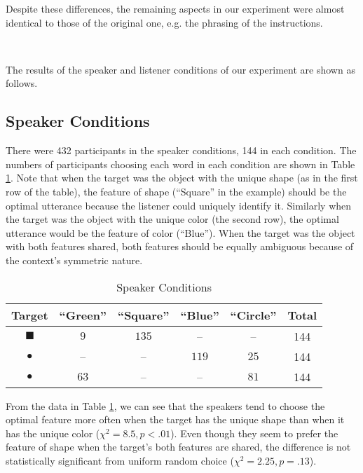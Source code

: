Despite these differences, the remaining aspects in our experiment were almost identical to those of the original one, e.g. the phrasing of the instructions.

\ 

The results of the speaker and listener conditions of our experiment are shown as follows.

 
\subsection{Speaker Conditions}

There were 432 participants in the speaker conditions, 144 in each condition. The numbers of participants choosing each word in each condition are shown in Table \ref{table:speaker}. Note that when the target was the object with the unique shape (as in the first row of the table), the feature of shape (``Square'' in the example) should be the optimal utterance because the listener could uniquely identify it. Similarly when the target was the object with the unique color (the second row), the optimal utterance would be the feature of color (``Blue''). When the target was the object with both features shared, both features should be equally ambiguous because of the context's symmetric nature.

\begin{table}[htb]   
  \caption{Speaker Conditions}
  \centering
  \begin{tabular}{c|ccccc}
   Target  & ``Green'' & ``Square'' & ``Blue'' & ``Circle'' & Total\\ 
     \hline
\textcolor{green!65}{\Large{$\blacksquare$}}    & $9$        &   $135$   & -- & -- &144\\
\textcolor{blue!65}{\Huge{$\bullet$}}           & --        &   --      & $119$ & $25$ & 144\\
\textcolor{green!65}{\Huge{$\bullet$}}          & $63$        &   --    &  --   & $81$             &144
  \end{tabular}

  \label{table:speaker}
\end{table}

From the data in Table \ref{table:speaker}, we can see that the speakers tend to choose the optimal feature more often when the target has the unique shape than when it has the unique color ($\chi^2=8.5, p<.01$). Even though they seem to prefer the feature of shape when the target's both features are shared, the difference is not statistically significant from uniform random choice ($\chi^2=2.25, p=.13$).


